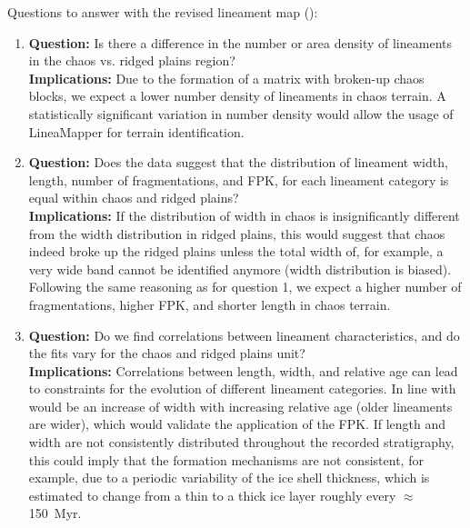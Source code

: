 
Questions to answer with the revised lineament map ():
\begin{enumerate}
    \item \textbf{Question:} Is there a difference in the number or area density of lineaments in the chaos vs. ridged plains region?\\
     \textbf{Implications:} Due to the formation of a matrix with broken-up chaos blocks, we expect a lower number density of lineaments in chaos terrain. A statistically significant variation in number density would allow the usage of LineaMapper for terrain identification.
    
    \item \textbf{Question:} Does the data suggest that the distribution of lineament width, length, number of fragmentations, and FPK, for each lineament category is equal within chaos and ridged plains?\\
    \textbf{Implications:} If the distribution of width in chaos is insignificantly different from the width distribution in ridged plains, this would suggest that chaos indeed broke up the ridged plains unless the total width of, for example, a very wide band cannot be identified anymore (width distribution is biased). Following the same reasoning as for question 1, we expect a higher number of fragmentations, higher FPK, and shorter length in chaos terrain. 

    \item \textbf{Question:} Do we find correlations between lineament characteristics, and do the fits vary for the chaos and ridged plains unit?\\
    \textbf{Implications:} Correlations between length, width, and relative age can lead to constraints for the evolution of different lineament categories. In line with would be an increase of width with increasing relative age (older lineaments are wider), which would validate the application of the FPK. If length and width are not consistently distributed throughout the recorded stratigraphy, this could imply that the formation mechanisms are not consistent, for example, due to a periodic variability of the ice shell thickness, which is estimated to change from a thin to a thick ice layer roughly every $\approx$150~Myr. 
\end{enumerate}

